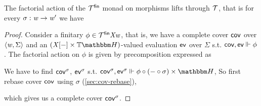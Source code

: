 \begin{theorem}
The factorial action of the $\mathcal{T}^{\mathsf{fin}}$ monad on morphisms lifts through $\mathcal{T}$, 
that is for every $\sigma : \mathit{w} \to \mathit{w}'$ we have
\begin{center}
\end{center}
\end{theorem}
\begin{proof}
Consider a finitary $\phi \in \mathcal{T}^{\mathsf{fin}}\mathit{X}\mathit{w}$, that is, we have a complete cover $\mathsf{cov}$ over $\langle\mathit{w}, \Sigma\rangle$ and an $(\vX\anyL\dash \times \theapF)$-valued evaluation $\mathsf{ev}$ over $\Sigma$ s.t. $\mathsf{cov},\mathsf{ev} \Vdash \phi$.
The factorial action on $\phi$ is given by precomposition expressed as
\begin{center}
\end{center}

We have to find $\mathsf{cov}^\sigma$, $\mathsf{ev}^\sigma$ s.t. $\cov^\sigma,\ev^\sigma \Vdash \phi \comp (\dash \comp \sigma) \times \heapF$,
So first rebase cover $\mathsf{cov}$ using $\sigma$ (\cref{sec:cov-rebase}),
\begin{center}
\end{center}
which gives us a complete cover $\mathsf{cov}^\sigma$.


\end{proof}
